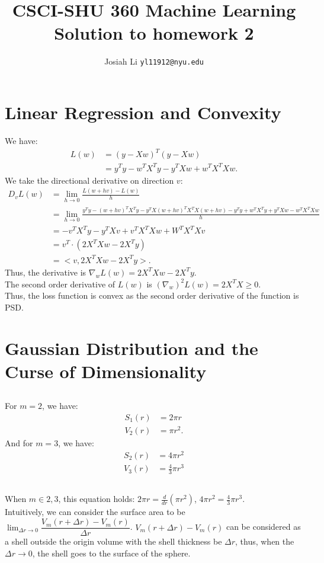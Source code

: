 \documentclass{article}
\title{CSCI-SHU 360 Machine Learning\\
    Solution to homework 2}
\author{Josiah Li \texttt{yl11912@nyu.edu}}
\begin{document}
    \maketitle
\section{Linear Regression and Convexity}
We have:
\begin{align*}
    L(w) &= (y - Xw)^T (y - Xw)\\
        &= y^Ty - w^TX^Ty - y^TXw+w^TX^TXw.
\end{align*}
We take the directional derivative on direction $ v $:
\begin{align*}
    D_vL(w) &= \lim_{h\to 0 } \frac{L(w+hv) - L(w )}{h}\\
            &=\lim_{h\to 0 } \frac{y^Ty - (w+hv)^TX^Ty - y^TX(w+hv)^TX^TX(w+hv)-y^Ty + w^TX^Ty + y^TXw - w^TX^TXw}{h}\\
            &= -v^TX^Ty - y^TXv + v^TX^TXw +W^TX^TXv\\
            &= v^T \cdot (2X^TXw - 2X^Ty)\\
            &= <v, 2X^TXw - 2X^T y>.
\end{align*}
Thus, the derivative is $\nabla_w L(w) = 2X^TXw - 2X^Ty $.\\
The second order derivative of $ L(w) $ is $ (\nabla_w)^2 L(w) = 2X^TX \geq 0 $.\\
Thus, the loss function is convex as the second order derivative of the function is PSD.
\clearpage
\section{Gaussian Distribution and the Curse of Dimensionality}
\subsection{}
For $ m = 2 $, we have:\\
\begin{align*}
    S_1(r) &= 2\pi r\\
    V_2 (r)&= \pi r^2.
\end{align*}
And for $ m = 3 $, we have:\\
\begin{align*}
    S_2(r) &= 4\pi r^2\\
    V_3(r)&= \frac{4}{3} \pi r^3
\end{align*}
\subsection{}
When $ m \in {2, 3} $, this equation holds: $ 2\pi r = \frac{d}{dr}(\pi r^2) $, $ 4\pi r^2 = \frac{4}{3}\pi r^3 $.\\
Intuitively, we can consider the surface area to be $ \lim_{\Delta r\to 0} \dfrac{V_m(r+\Delta r) - V_m(r)}{\Delta r} $.  $ V_m(r + \Delta r) - V_m(r)  $ can be considered as a shell outside the origin volume with the shell thickness be $ \Delta r $, thus, when the $ \Delta r\to 0 $, the shell goes to the surface of the sphere.
\end{document}
